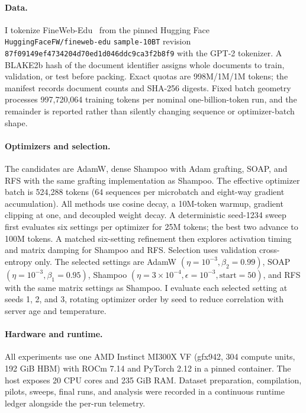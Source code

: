 \documentclass[10pt]{article}
\newcommand{\RFS}{\textsc{RFS}}
\begin{document}
\paragraph{Data.}
I tokenize FineWeb-Edu~\citep{penedo2024fineweb} from the pinned Hugging Face
\texttt{HuggingFaceFW/fineweb-edu} \texttt{sample-10BT} revision
\texttt{87f09149ef4734204d70ed1d046ddc9ca3f2b8f9} with the GPT-2 tokenizer. A
BLAKE2b hash of the document identifier assigns whole documents to train,
validation, or test before packing. Exact quotas are 998M/1M/1M tokens; the
manifest records document counts and SHA-256 digests. Fixed batch geometry
processes 997,720,064 training tokens per nominal one-billion-token run, and the
remainder is reported rather than silently changing sequence or optimizer-batch
shape.

\paragraph{Optimizers and selection.}
The candidates are AdamW, dense Shampoo with Adam grafting, SOAP, and \RFS{} with
the same grafting implementation as Shampoo. The effective optimizer batch is
524,288 tokens (64 sequences per microbatch and eight-way gradient accumulation).
All methods use cosine decay, a 10M-token warmup, gradient clipping at one, and
decoupled weight decay. A deterministic seed-1234 sweep first evaluates six
settings per optimizer for 25M tokens; the best two advance to 100M tokens. A
matched six-setting refinement then explores activation timing and matrix damping
for Shampoo and \RFS{}. Selection uses validation cross-entropy only. The selected
settings are AdamW $(\eta=10^{-3},\beta_2=0.99)$, SOAP
$(\eta=10^{-3},\beta_1=0.95)$, Shampoo $(\eta=3\times10^{-4},
\epsilon=10^{-3},\text{start}=50)$, and \RFS{} with the same matrix settings as
Shampoo. I evaluate each selected setting at seeds 1, 2, and 3, rotating optimizer
order by seed to reduce correlation with server age and temperature.

\paragraph{Hardware and runtime.}
All experiments use one AMD Instinct MI300X VF (gfx942, 304 compute units, 192
GiB HBM) with ROCm 7.14 and PyTorch 2.12 in a pinned container. The host exposes
20 CPU cores and 235 GiB RAM. Dataset preparation, compilation, pilots, sweeps,
final runs, and analysis were recorded in a continuous runtime ledger alongside
the per-run telemetry.
\end{document}
